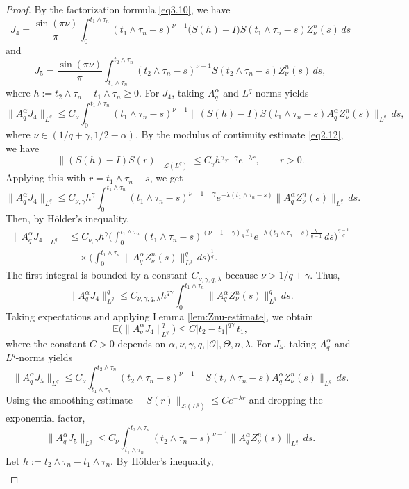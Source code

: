 \documentclass[10pt]{article}
\numberwithin{figure}{section}
\numberwithin{equation}{section}
\newcommand{\0}{{\theta}}
\begin{document}
\begin{proof}
By the factorization formula \eqref{eq3.10}, we have
$$
J_4=\frac{\sin(\pi\nu)}{\pi}
\int_0^{t_1\wedge\tau_n}(t_1\wedge\tau_n-s)^{\nu-1}\big(S(h)-I\big)
S(t_1\wedge\tau_n-s)Z_\nu^n(s)\,ds
$$
and
$$
J_5=\frac{\sin(\pi\nu)}{\pi}
\int_{t_1\wedge\tau_n}^{t_2\wedge\tau_n}
(t_2\wedge\tau_n-s)^{\nu-1}S(t_2\wedge\tau_n-s)Z_\nu^n(s)\,ds,
$$
where $h:=t_2\wedge\tau_n-t_1\wedge\tau_n\ge0$.
\vs
For $J_4$, taking $A_q^\alpha$ and $L^q$-norms yields
$$
\|A_q^\alpha J_4\|_{L^q}
\le C_\nu
\int_0^{t_1\wedge\tau_n}(t_1\wedge\tau_n-s)^{\nu-1}
\|(S(h)-I)S(t_1\wedge\tau_n-s)A_q^\alpha Z_\nu^n(s)\|_{L^q}\,ds,
$$
where $\nu\in(1/q+\gamma,1/2-\alpha)$.
By the modulus of continuity estimate \eqref{eq2.12}, we have
$$
\|(S(h)-I)S(r)\|_{\mathcal L(L^q)}
\le C_\gamma h^\gamma r^{-\gamma} e^{-\lambda r},\qquad r>0.
$$
Applying this with $r=t_1\wedge\tau_n-s$, we get
$$
\|A_q^\alpha J_4\|_{L^q}
\le C_{\nu,\gamma} h^\gamma
\int_0^{t_1\wedge\tau_n}(t_1\wedge\tau_n-s)^{\nu-1-\gamma}
e^{-\lambda(t_1\wedge\tau_n-s)}
\|A_q^\alpha Z_\nu^n(s)\|_{L^q}\,ds.
$$
Then, by H\"older's inequality,
$$
\begin{aligned}
\|A_q^\alpha J_4\|_{L^q}
&\le C_{\nu,\gamma} h^\gamma
\Bigg(\int_0^{t_1\wedge\tau_n}
(t_1\wedge\tau_n-s)^{(\nu-1-\gamma)\frac{q}{q-1}}
e^{-\lambda(t_1\wedge\tau_n-s)\frac{q}{q-1}}\,ds\Bigg)^{\frac{q-1}{q}} \\
&\quad\times
\Bigg(\int_0^{t_1\wedge\tau_n}
\|A_q^\alpha Z_\nu^n(s)\|_{L^q}^q\,ds\Bigg)^{\frac{1}{q}}.
\end{aligned}
$$
The first integral is bounded by a constant $C_{\nu,\gamma,q,\lambda}$ because $\nu>1/q+\gamma$. Thus,
$$
\|A_q^\alpha J_4\|_{L^q}^q
\le C_{\nu,\gamma,q,\lambda} h^{q\gamma}
\int_0^{t_1\wedge\tau_n}
\|A_q^\alpha Z_\nu^n(s)\|_{L^q}^q\,ds.
$$
Taking expectations and applying Lemma \ref{lem:Znu-estimate}, we obtain
$$
\mathbb{E}\big(\|A_q^\alpha J_4\|_{L^q}^q\big)
\le C |t_2-t_1|^{q\gamma}\,t_1,
$$
where the constant $C>0$ depends on $\alpha,\nu,\gamma,q,|\mathcal O|,\Theta,n,\lambda$.
\vs
For $J_5$, taking $A_q^\alpha$ and $L^q$-norms yields
$$
\|A_q^\alpha J_5\|_{L^q}
\le C_\nu
\int_{t_1\wedge\tau_n}^{t_2\wedge\tau_n}
(t_2\wedge\tau_n-s)^{\nu-1}
\|S(t_2\wedge\tau_n-s)A_q^\alpha Z_\nu^n(s)\|_{L^q}\,ds.
$$
Using the smoothing estimate $\|S(r)\|_{\mathcal L(L^q)}\le C e^{-\lambda r}$ and dropping the exponential factor,
$$
\|A_q^\alpha J_5\|_{L^q}
\le C_{\nu}
\int_{t_1\wedge\tau_n}^{t_2\wedge\tau_n}
(t_2\wedge\tau_n-s)^{\nu-1}
\|A_q^\alpha Z_\nu^n(s)\|_{L^q}\,ds.
$$
Let $h:=t_2\wedge\tau_n-t_1\wedge\tau_n$. By H\"older's inequality,
$$
\begin{aligned}

\end{aligned}$$
\end{proof}
\end{document}
